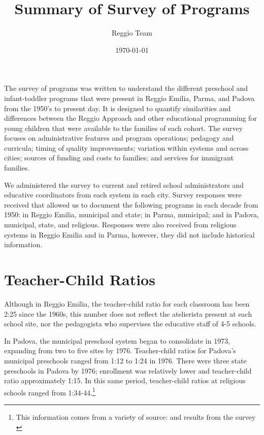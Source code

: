 \documentclass[12pt]{article}
\begin{document}
\title{Summary of Survey of Programs}
\author{Reggio Team}
\date{\today}
\maketitle

\doublespacing

The survey of programs was written to understand the different preschool and infant-toddler programs that were present in Reggio Emilia, Parma, and Padova from the 1950's to present day. It is designed to quantify similarities and differences between the Reggio Approach and other educational programming for young children that were available to the families of each cohort. The survey focuses on administrative features and program operations; pedagogy and curricula; timing of quality improvements; variation within systems and across cities; sources of funding and costs to families; and services for immigrant families.

We administered the survey to current and retired school administrators and educative coordinators from each system in each city. Survey responses were received that allowed us to document the following programs in each decade from 1950: in Reggio Emilia, municipal and state; in Parma, municipal; and in Padova, municipal, state, and religious. Responses were also received from religious systems in Reggio Emilia and in Parma, however, they did not include historical information.

\section{Teacher-Child Ratios}
Although in Reggio Emilia, the teacher-child ratio for each classroom has been 2:25 since the 1960s, this number does not reflect the atelierista present at each school site, nor the pedagogista who supervises the educative staff of 4-5 schools. 

In Padova, the municipal preschool system began to consolidate in 1973, expanding from two to five sites by 1976. Teacher-child ratios for Padova's municipal preschools ranged from 1:12 to 1:24 in 1976. There were three state preschools in Padova by 1976; enrollment was relatively lower and teacher-child ratio approximately 1:15. In this same period, teacher-child ratios at religious schools ranged from 1:34-44.\footnote{This information comes from a variety of source: \citet{Reggio-Admin-data_1966-2006, Reggio-Annual-Journals_1994-2011, Padova-Admin-Data_1964-2011} and results from the survey \citep{CEHD_2016_Historical-Analysis}} 
 
\end{document}
